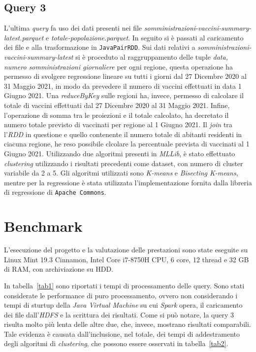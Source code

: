 \documentclass[conference]{IEEEtran}
\begin{document}
\subsection*{\textbf{Query 3}}
L'ultima \emph{query} fa uso dei dati presenti nei file \textit{somministrazioni-vaccini-summary-latest.parquet} e \textit{totale-popolazione.parquet}. In seguito si \`{e} passati al caricamento dei file e alla trasformazione in \texttt{JavaPairRDD}. Sui dati relativi a \textit{somministrazioni-vaccini-summary-latest} si \`{e} proceduto al raggruppamento delle tuple \emph{data, numero somministrazioni giornaliere} per ogni regione, questa operazione ha permesso di svolgere regressione lineare su tutti i giorni dal 27 Dicembre 2020 al 31 Maggio 2021, in modo da prevedere il numero di vaccini effettuati in data 1 Giugno 2021. Una \emph{reduceByKey} sulle regioni ha, invece, permesso di calcolare il totale di vaccini effettuati dal 27 Dicembre 2020 al 31 Maggio 2021. Infine, l'operazione di somma tra le proiezioni e il totale calcolato, ha decretato il numero totale previsto di vaccinati per regione al 1 Giugno 2021. Il \emph{join} tra l'\emph{RDD} in questione e quello contenente il numero totale di abitanti residenti in ciacuna regione, he reso possibile clcolare la percentuale prevista di vaccinati al 1 Giugno 2021. Utilizzando due algoritmi presenti in \emph{MLLib}, \`{e} stato effettuato \emph{clustering} utilizzando i risultati precedenti come dataset, con numero di cluster variabile da 2 a 5. Gli algoritmi utilizzati sono \emph{K-means} e \emph{Bisecting K-means}, mentre per la regressione \`{e} stata utilizzata l'implementazione fornita dalla libreria di regressione di \texttt{Apache Commons}.

\section{\textbf{Benchmark}}
L'esecuzione del progetto e la valutazione delle prestazioni sono state eseguite su Linux Mint 19.3 Cinnamon, Intel Core i7-8750H CPU, 6 core, 12 thread e 32 GB di RAM, con archiviazione su HDD. \\
\par In tabella~\ref{tab1} sono riportati i tempi di processamento delle query. Sono stati considerate le performance di puro processamento, ovvero non considerando i tempi di sturtup della \emph{Java Virtual Machine} su cui \emph{Spark} opera, il caricamento dei file dall'\emph{HDFS} e la scrittura dei risultati. Come si pu\`{o} notare, la query 3 risulta molto pi\`{u} lenta delle altre due, che, invece, mostrano risultati comparabili. Tale evidenza \`{e} causata dall'inclusione, nel totale, dei tempi di addestramento degli algoritmi di \emph{clustering}, che possono essere osservati in tabella~\ref{tab2}.
\end{document}
